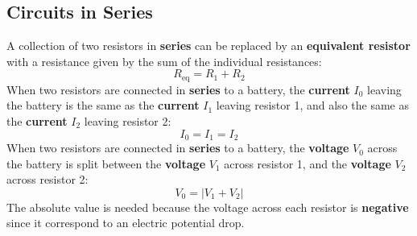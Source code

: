 \subsection{Circuits in Series}
A collection of two resistors in \textbf{series} can be replaced by an \textbf{equivalent resistor} with a resistance given by the sum of the individual resistances:
\begin{equation} \label{eq.03.RSeries}
	R_{\text{eq}} = R_{1} + R_{2}
\end{equation}
When two resistors are connected in \textbf{series} to a battery, the \textbf{current} $I_{0}$ leaving the battery is the same as the \textbf{current} $I_{1}$ leaving resistor 1, and also the same as the \textbf{current} $I_{2}$ leaving resistor 2:
\begin{equation} \label{eq.03.ISeries}
	I_{0} = I_{1} = I_{2}
\end{equation}
When two resistors are connected in \textbf{series} to a battery, the \textbf{voltage} $V_{0}$ across the battery is split between the \textbf{voltage} $V_{1}$ across resistor 1, and the \textbf{voltage} $V_{2}$ across resistor 2:
\begin{equation} \label{eq.03.VSeries}
	V_{0} = \left| V_{1} + V_{2} \right|
\end{equation}
The absolute value is needed because the voltage across each resistor is \textbf{negative} since it correspond to an electric potential drop.

